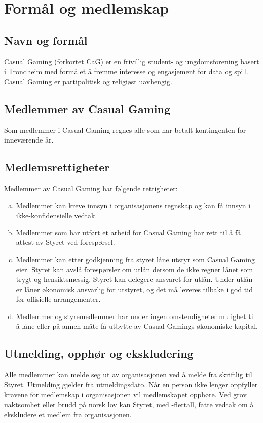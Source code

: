 \chapter{Formål og medlemskap}

\emptychapterspacing

\section{Navn og formål}
Casual Gaming (forkortet CaG) er en frivillig student- og ungdomsforening basert i Trondheim med formålet å fremme interesse og engasjement for data og spill. Casual Gaming er partipolitisk og religiøst uavhengig.

\section{Medlemmer av Casual Gaming}
Som medlemmer i Casual Gaming regnes alle som har betalt kontingenten for inneværende år.

\section{Medlemsrettigheter}
Medlemmer av Casual Gaming har følgende rettigheter:
\begin{enumerate}[a.]
    \item Medlemmer kan kreve innsyn i organisasjonens regnskap og kan få innsyn i ikke-konfiden\-sielle vedtak.
    \item Medlemmer som har utført et arbeid for Casual Gaming har rett til å få attest av Styret ved forespørsel.
    \item Medlemmer kan etter godkjenning fra styret låne utstyr som Casual Gaming eier. Styret kan avslå forespørsler om utlån dersom de ikke regner lånet som trygt og hensiktsmessig. Styret kan delegere ansvaret for utlån. Under utlån er låner økonomisk ansvarlig for utstyret, og det må leveres tilbake i god tid før offisielle arrangementer.
    \item Medlemmer og styremedlemmer har under ingen omstendigheter mulighet til å låne eller på annen måte få utbytte av Casual Gamings økonomiske kapital.
\end{enumerate}

\section{Utmelding, opphør og ekskludering}
Alle medlemmer kan melde seg ut av organisasjonen ved å melde fra skriftlig til Styret. Utmelding gjelder fra utmeldingsdato. Når en person ikke lenger oppfyller kravene for medlemskap i organisasjonen vil medlemskapet opphøre. Ved grov uaktsomhet eller brudd på norsk lov kan Styret, med -flertall, fatte vedtak om å ekskludere et medlem fra organisasjonen.

